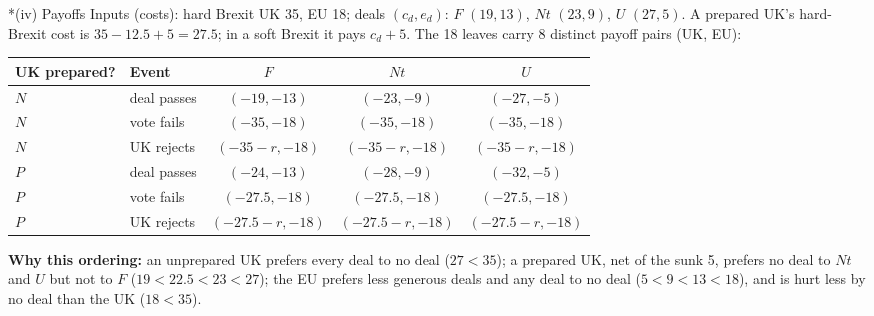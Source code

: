 \documentclass[10pt,a4paper]{article}
\makeatletter
\renewcommand\section{\@startsection{section}{1}{\z@}{6pt plus 2pt}{2pt}{\normalfont\large\bfseries}}
\newcommand{\Nt}{\mathit{Nt}}
\newcommand{\dF}{\mathit{F}}
\newcommand{\dU}{\mathit{U}}
\makeatother
\begin{document}
\section*{(iv) Payoffs}
Inputs (costs): hard Brexit UK 35, EU 18; deals $(c_d,e_d)$: $\dF$ $(19,13)$, $\Nt$ $(23,9)$,
$\dU$ $(27,5)$. A prepared UK's hard-Brexit cost is $35-12.5+5=27.5$; in a soft Brexit it pays $c_d+5$.
The 18 leaves carry 8 distinct payoff pairs (UK, EU):

\begin{center}\small
\begin{tabular}{llccc}
\toprule
UK prepared? & Event & $\dF$ & $\Nt$ & $\dU$ \\
\midrule
$N$ & deal passes   & $(-19,-13)$ & $(-23,-9)$ & $(-27,-5)$ \\
$N$ & vote fails    & $(-35,-18)$ & $(-35,-18)$ & $(-35,-18)$ \\
$N$ & UK rejects    & $(-35-r,-18)$ & $(-35-r,-18)$ & $(-35-r,-18)$ \\
\midrule
$P$ & deal passes   & $(-24,-13)$ & $(-28,-9)$ & $(-32,-5)$ \\
$P$ & vote fails    & $(-27.5,-18)$ & $(-27.5,-18)$ & $(-27.5,-18)$ \\
$P$ & UK rejects    & $(-27.5-r,-18)$ & $(-27.5-r,-18)$ & $(-27.5-r,-18)$ \\
\bottomrule
\end{tabular}
\end{center}
\textbf{Why this ordering:} an unprepared UK prefers every deal to no deal ($27<35$); a prepared UK,
net of the sunk 5, prefers no deal to $\Nt$ and $\dU$ but not to $\dF$ ($19<22.5<23<27$); the EU
prefers less generous deals and any deal to no deal ($5<9<13<18$), and is hurt less by no deal than the UK ($18<35$).
\end{document}

